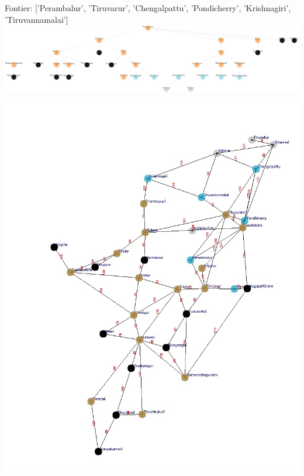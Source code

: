 \documentclass[xcolor=table]{beamer}
\begin{document}
\begin{frame}
  { \tiny Fontier: ['Perambalur', 'Tiruvarur', 'Chengalpattu', 'Pondicherry', 'Krishnagiri', 'Tiruvannamalai']}
  \includegraphics[width=1\textwidth]{../BFSNodes/37-1.png}
  \begin{center}
    \includegraphics[height=0.6\textheight]{../BFSoutput/tamilBFS35.jpg}
  \end{center}
\end{frame}
\end{document}
